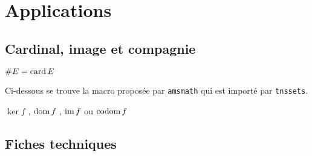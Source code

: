 \documentclass[12pt,a4paper]{article}
\begin{document}
\section{Applications}

\subsection{Cardinal, image et compagnie}


\begin{latexex}
$\card* E = \card E$
\end{latexex}





Ci-dessous se trouve la macro  proposée par \verb+amsmath+ qui est importé par \verb+tnssets+.

\begin{latexex}
$\ker f$ , $\operatorname{\operatorname{dom}} f$ ,
$\operatorname{\operatorname{im}} f$ ou $\operatorname{\operatorname{codom}} f$
\end{latexex}




\subsection{Fiches techniques}




\separation




\end{document}
